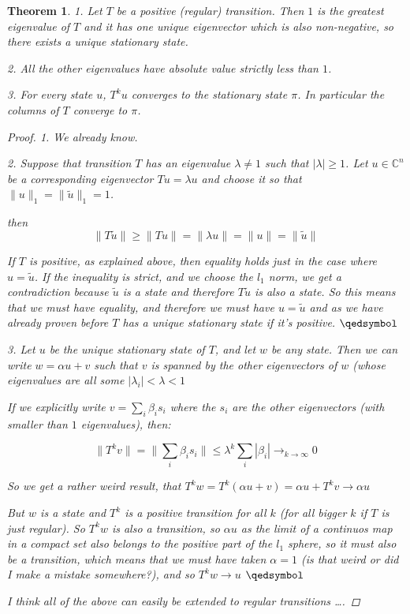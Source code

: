 \documentclass[a4paper,10pt]{article}
\newcommand{\C}{\mathbb{C}}
\theoremstyle{definition}
\theoremstyle{remark}
\theoremstyle{plain}
\newtheorem{thm}{Theorem}[section]
\begin{document}
\begin{thm}
\label{thm1}
1. Let $T$ be a positive (regular) transition. Then $1$ is the greatest eigenvalue
of $T$ and it has one unique eigenvector which is also non-negative,
so there exists a unique stationary state.

2. All the other eigenvalues have absolute value strictly less than $1$.

3. For every state $u$, $T^ku$ converges to the stationary state $\pi$.
In particular the columns of $T$ converge to $\pi$.

\begin{proof}
1. We already know.

2.
Suppose that transition $T$ has an eigenvalue $\lambda \neq 1$ such that
$|\lambda| \geq 1$.
Let $u \in \C^n$ be a corresponding eigenvector $Tu = \lambda u$ and choose it
so that $\|u\|_1 = \|\tilde{u}\|_1 = 1$.

then 
$$
\|T\tilde{u}\| \geq \|Tu\| = \|\lambda u\|
= \|u\| = \|\tilde{u}\|
$$

If $T$ is positive, as explained above, then equality holds just in the case
where $u = \tilde{u}$. If the inequality is strict, and we choose the $l_1$
norm, we get a contradiction because $\tilde{u}$ is a state and therefore
$T\tilde{u}$ is also a state. So this means that we must have equality, and
therefore we must have $u = \tilde{u}$ and as we have already proven before $T$
has a unique stationary state if it's positive. $\qedsymbol$

3. Let $u$ be the unique stationary state of $T$, and let $w$ be any state.
Then we can write $w = \alpha u + v$ such that $v$ is spanned by the other
eigenvectors of $w$ (whose eigenvalues are all some $|\lambda_i| < \lambda < 1$

If we explicitly write $v = \sum_i \beta_i s_i$ where the $s_i$ are the other
eigenvectors (with smaller than $1$ eigenvalues), then:

$$
\|T^k v\| = \|\sum_i \beta_i s_i \| \leq 
\lambda^k \sum_i |\beta_i| \to_{k \to \infty} 0
$$

So we get a rather weird result, that 
$T^kw = 
T^k(\alpha u + v) = \alpha u + T^k v \to \alpha u$

But $w$ is a state and $T^k$ is a positive transition for all $k$ (for all
bigger $k$ if $T$ is just regular). So $T^kw$ is also a transition, so
$\alpha u$ as the limit of a continuos map in a compact set 
also belongs to the positive part of the $l_1$ sphere, so it
must also be a transition, which means that we must have taken
$\alpha = 1$ (is that weird or did I make a mistake somewhere?),
and so $T^k w \to u$ $\qedsymbol$ 

I think all of the above can easily be extended to regular transitions \dots.

\end{proof}
\end{thm}
\end{document}
